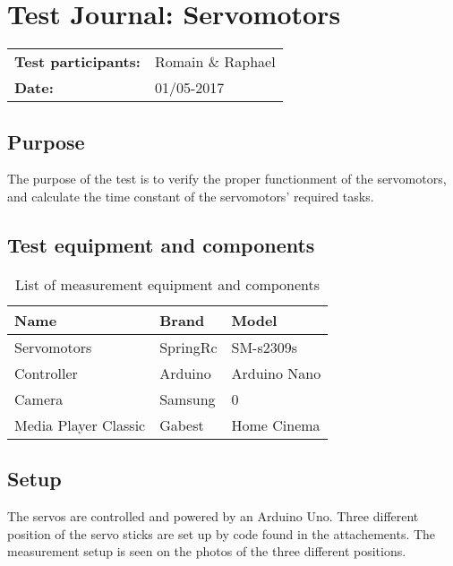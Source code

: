 \graphicspath{{figures/design/}}


\chapter{Test Journal: Servomotors}
\label{ssc:Servomotors}

\begin{table}[!h]
\begin{tabular}{l l}
\textbf{Test participants:} & Romain \& Raphael   \\
\textbf{Date:}  & 01/05-2017
\end{tabular}
\end{table}

\section*{Purpose}
	
The purpose of the test is to verify the proper functionment of the servomotors, and calculate the time constant of the servomotors' required tasks.
	
\section*{Test equipment and components}


\begin{table}[htbp]
	\centering
	\caption{List of measurement equipment and components}\label{tab_appendix:Servo_equip2}
	
	\begin{tabularx}{\textwidth}{lXX}
		Name & Brand	& Model \\ \toprule 
		Servomotors	& SpringRc & SM-s2309s 	\\ \rowcolor{lightGrey}
		Controller	& Arduino & Arduino Nano \\ 
		Camera & Samsung & 0 \\ \rowcolor{lightGrey}
		Media Player Classic & Gabest & Home Cinema\\ 
	\end{tabularx}
\end{table}




	\section*{Setup}
	
The servos are controlled and powered by an Arduino Uno. Three different position of the servo sticks are set up by code found in the attachements. The measurement setup is seen on the photos of the three different positions. \

